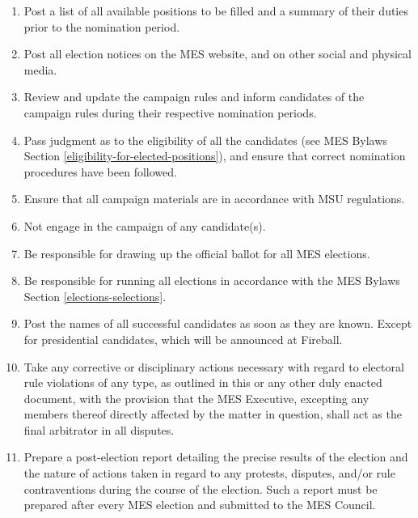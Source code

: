 \begin{enumerate}
  \begin{enumerate}
   \item
    Post a list of all available positions to be filled and a summary of
    their duties prior to the nomination period.
   \item
    Post all election notices on the MES website, and on other social
    and physical media.
   \item
    Review and update the campaign rules and inform candidates of the
    campaign rules during their respective nomination periods.
   \item
    Pass judgment as to the eligibility of all the candidates (see MES
    Bylaws Section \ref{eligibility-for-elected-positions}), and ensure that 
    correct nomination procedures have been followed.
   \item
    Ensure that all campaign materials are in accordance with MSU
    regulations.
   \item
    Not engage in the campaign of any candidate(s).
   \item
    Be responsible for drawing up the official ballot for all MES
    elections.
   \item
    Be responsible for running all elections in accordance with the MES
    Bylaws Section \ref{elections-selections}.
   \item
    Post the names of all successful candidates as soon as they are
    known. Except for presidential candidates, which will be announced
    at Fireball.
   \item
    Take any corrective or disciplinary actions necessary with regard to
    electoral rule violations of any type, as outlined in this or any
    other duly enacted document, with the provision that the MES
    Executive, excepting any members thereof directly affected by the
    matter in question, shall act as the final arbitrator in all
    disputes.
   \item
    Prepare a post-election report detailing the precise results of the
    election and the nature of actions taken in regard to any protests,
    disputes, and/or rule contraventions during the course of the
    election. Such a report must be prepared after every MES election
    and submitted to the MES Council.
  \end{enumerate}
\end{enumerate}

